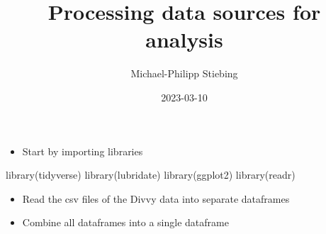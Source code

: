 \documentclass[
]{article}
\title{Processing data sources for analysis}
\author{Michael-Philipp Stiebing}
\date{2023-03-10}
\newenvironment{Shaded}{\begin{snugshade}}{\end{snugshade}}
\newcommand{\FunctionTok}[1]{\textcolor[rgb]{0.00,0.00,0.00}{#1}}
\newcommand{\NormalTok}[1]{#1}
\providecommand{\tightlist}{%
  \setlength{\itemsep}{0pt}\setlength{\parskip}{0pt}}
\begin{document}
\maketitle

\fontsize{10}{12}
\selectfont

\begin{itemize}
\tightlist
\item
  Start by importing libraries
\end{itemize}

\fontsize{9}{11}
\selectfont

\begin{Shaded}
\begin{Highlighting}[]
\FunctionTok{library}\NormalTok{(tidyverse)}
\FunctionTok{library}\NormalTok{(lubridate)}
\FunctionTok{library}\NormalTok{(ggplot2)}
\FunctionTok{library}\NormalTok{(readr)}
\end{Highlighting}
\end{Shaded}

\fontsize{10}{12}
\selectfont

\begin{itemize}
\tightlist
\item
  Read the csv files of the Divvy data into separate dataframes
\item
  Combine all dataframes into a single dataframe
\end{itemize}

\fontsize{9}{11}
\selectfont
\end{document}
